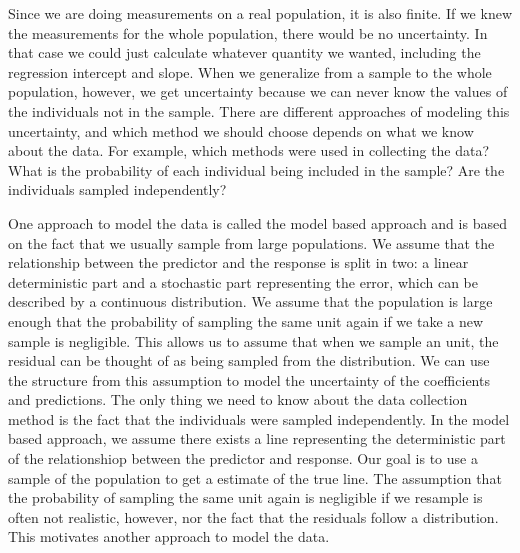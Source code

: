 \documentclass{article}
\begin{document}
Since we are doing measurements on a real population, it is also finite.
If we knew the measurements for the whole population, there
would be no uncertainty. In that case we could just calculate whatever quantity we
wanted, including the regression intercept and slope. When we generalize from a sample to the whole population, however, we get
uncertainty because we can never know the values of the individuals not in the sample. There are different approaches of modeling this uncertainty, and
which method we should choose depends on what we know about the data. For example, which
methods were used in collecting the data?
What is the probability of each
individual being included in the sample? Are the individuals sampled independently? 

One approach to model the data is called the model based approach and is based
on the fact that we usually sample from large populations. We assume that the
relationship between the predictor and the response is split in two: a linear deterministic
part and a stochastic part representing the error, which can be described by a continuous distribution. We assume that the population
is large enough that the probability of sampling the same unit again if we take
a new sample is negligible. This allows us to assume that when we sample an unit, 
the residual can be thought of as being sampled from the distribution. We can use the
structure from this assumption to
model the uncertainty of the coefficients and predictions. The only thing we need
to know about the data collection method is the fact that the individuals were
sampled independently. In the model based approach, we assume there exists a
line representing the deterministic part of the relationshiop between the
predictor and response. Our goal is to use a sample of the population to get a
estimate of the true line. The assumption that the
probability of sampling the same unit again is negligible if we resample is often not
realistic, however, nor the fact that the residuals follow a
distribution. This motivates another approach to model the data. 


\end{document}
